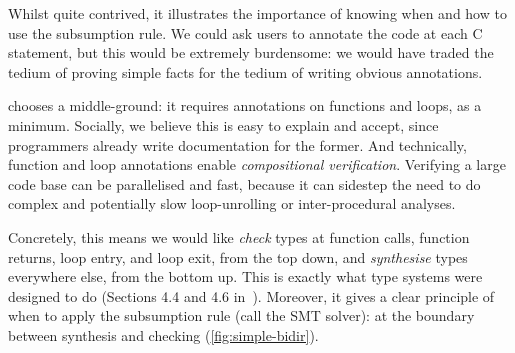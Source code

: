 Whilst quite contrived, it illustrates the importance of knowing when and how
to use the subsumption rule. We could ask users to annotate the code at each C
statement, but this would be extremely burdensome: we would have traded the
tedium of proving simple facts for the tedium of writing obvious annotations.

 chooses a middle-ground: it requires annotations on functions and
loops, as a minimum. Socially, we believe this is easy to explain and accept,
since programmers already write documentation for the former. And technically,
function and loop annotations enable \emph{compositional verification}.
Verifying a large code base can be parallelised and fast, because it can
sidestep the need to do complex and potentially slow loop-unrolling or
inter-procedural analyses.

Concretely, this means we would like \emph{check} types at function calls,
function returns, loop entry, and loop exit, from the top down, and
\emph{synthesise} types everywhere else, from the bottom up. This is exactly
what  type systems were designed to do (Sections 4.4 and 4.6
in~). Moreover, it gives a clear principle of
when to apply the subsumption rule (call the SMT solver): at the boundary
between synthesis and checking (\cref{fig:simple-bidir}).

